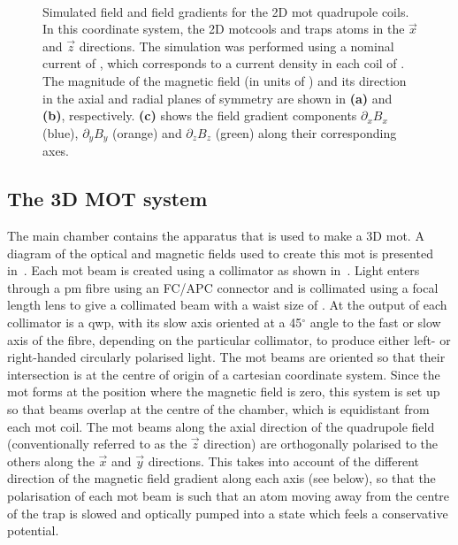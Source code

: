 \begin{figure}
	\centering
	\def\svgwidth{\columnwidth}
	\\
	\caption[Simulated field and field gradients for the 2D \ac{mot} quadrupole
		coils]{Simulated field and field gradients for the 2D \ac{mot}
		quadrupole coils. In this coordinate system, the 2D \ac{mot}cools and
		traps atoms in the \(\vec{x}\) and \(\vec{z}\) directions. The
		simulation was performed using a nominal current of
		, which corresponds to a current density in each
		coil of . The magnitude of
		the magnetic field (in units of \sivalue{}{\gauss}) and its direction in
		the axial and radial planes of symmetry are shown in \textbf{(a)} and
		\textbf{(b)}, respectively. \textbf{(c)} shows the field gradient
		components \(\partial_x B_x\) (blue), \(\partial_y B_y\) (orange) and
		\(\partial_z B_z\) (green) along their corresponding axes.}
	\label{fig:2d_mot_field_gradient}
\end{figure}
\subsection{The 3D MOT system}\label{sec:3d_mot}
The main chamber contains the apparatus that is used to make a 3D \ac{mot}. A
diagram of the optical and magnetic fields used to create this \ac{mot} is
presented in~. Each \ac{mot} beam is created using a
collimator as shown in~. Light enters through a
\ac{pm} fibre using an FC/APC connector and is collimated using a
 focal length lens to give a collimated beam with a
waist size of . At the output of each
collimator is a \ac{qwp}, with its slow axis oriented at a 45\(^\circ\) angle to
the fast or slow axis of the fibre, depending on the particular collimator, to
produce either left- or right-handed circularly polarised light. The \ac{mot}
beams are oriented so that their intersection is at the centre of origin of a
cartesian coordinate system. Since the \ac{mot} forms at the position where the
magnetic field is zero, this system is set up so that beams overlap at the
centre of the chamber, which is equidistant from each \ac{mot} coil. The
\ac{mot} beams along the axial direction of the quadrupole field (conventionally
referred to as the \(\vec{z}\) direction) are orthogonally polarised to the
others along the \(\vec{x}\) and \(\vec{y}\) directions. This takes into account
of the different direction of the magnetic field gradient along each axis (see
below), so that the polarisation of each \ac{mot} beam is such that an atom
moving away from the centre of the trap is slowed and optically pumped into a
state which feels a conservative potential.

